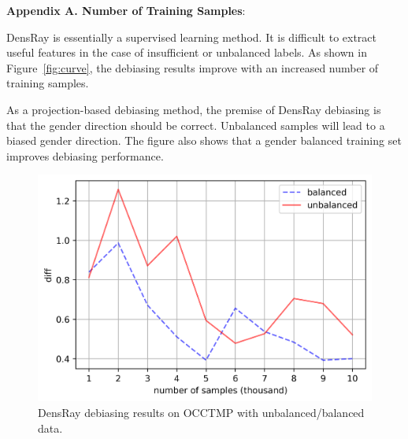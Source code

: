 \documentclass[11pt]{article}
\def\figref#1{Figure~\ref{fig:#1}}
\def\figlabel#1{\label{fig:#1}\label{p:#1}}
\def\eqref#1{Eq.~\ref{eqn:#1}}
\begin{document}

{\bf Appendix A. Number of Training Samples}:

DensRay is essentially a supervised learning method. It is difficult to extract useful features in the case of insufficient or unbalanced labels.  As shown in \figref{curve}, the debiasing results improve with an increased number of training samples.

As a projection-based debiasing method, the premise of DensRay debiasing is that the gender direction should be correct. Unbalanced samples will lead to a biased gender direction. 
The figure also shows that a gender balanced training set improves debiasing performance.
\begin{figure}[h]
	\centering
	\footnotesize
	\includegraphics[width=0.4\linewidth]{samples}
	\caption{DensRay debiasing results on OCCTMP with unbalanced/balanced data.}
	\figlabel{curve}
\end{figure}
\end{document}
